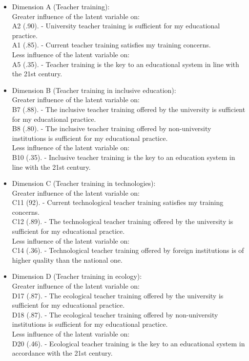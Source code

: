 \documentclass{textolivre}
\begin{document}
\begin{itemize}
    \item Dimension A (Teacher training): 
    \\ Greater influence of the latent variable on:
    \\ A2 (.90). - University teacher training is sufficient for my educational practice.
    \\ A1 (.85). - Current teacher training satisfies my training concerns.
    \\ Less influence of the latent variable on:
    \\ A5 (.35). - Teacher training is the key to an educational system in line with the 21st century.
    
    \item Dimension B (Teacher training in inclusive education): 
    \\ Greater influence of the latent variable on:
    \\ B7 (.88). - The inclusive teacher training offered by the university is sufficient for my educational practice.
    \\ B8 (.80). - The inclusive teacher training offered by non-university institutions is sufficient for my educational practice.
    \\ Less influence of the latent variable on:
    \\ B10 (.35). - Inclusive teacher training is the key to an education system in line with the 21st century.
    
    \item Dimension C (Teacher training in technologies):
    \\ Greater influence of the latent variable on:
    \\ C11 (92). - Current technological teacher training satisfies my training concerns.
    \\ C12 (.89). - The technological teacher training offered by the university is sufficient for my educational practice.
    \\ Less influence of the latent variable on:
    \\ C14 (.36). - Technological teacher training offered by foreign institutions is of higher quality than the national one.
    
    \item Dimension D (Teacher training in ecology):
    \\ Greater influence of the latent variable on:
    \\ D17 (.87). - The ecological teacher training offered by the university is sufficient for my educational practice.
    \\ D18 (.87). - The ecological teacher training offered by non-university institutions is sufficient for my educational practice.
    \\ Less influence of the latent variable on:
    \\ D20 (.46). - Ecological teacher training is the key to an educational system in accordance with the 21st century.
    

\end{itemize}
\end{document}
